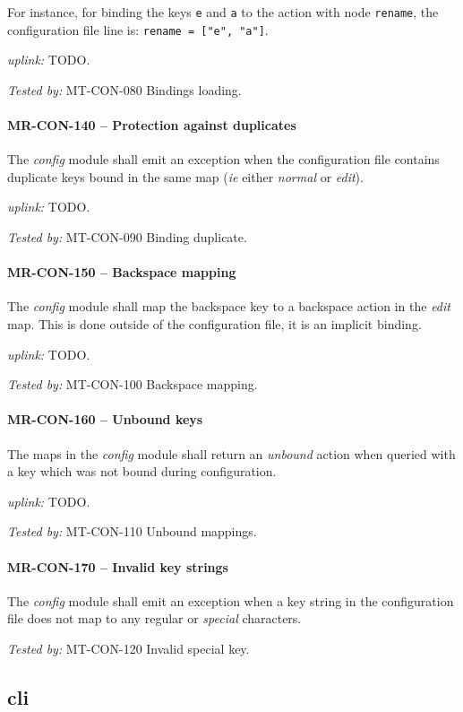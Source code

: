 For instance, for binding the keys \lstinline{e} and \lstinline{a}
to the action with node \lstinline{rename}, the configuration file
line is: \lstinline{rename = ["e", "a"]}.

\textit{uplink: } TODO.

\textit{Tested by: } MT-CON-080 Bindings loading.

\paragraph{MR-CON-140 -- Protection against duplicates}
The \emph{config} module shall emit an exception when the configuration
file contains duplicate keys bound in the same map (\textit{ie} either
\emph{normal} or \emph{edit}).

\textit{uplink: } TODO.

\textit{Tested by: } MT-CON-090 Binding duplicate.

\paragraph{MR-CON-150 -- Backspace mapping}
The \emph{config} module shall map the backspace key to a backspace
action in the \emph{edit} map. This is done outside of the configuration
file, it is an implicit binding.

\textit{uplink: } TODO.

\textit{Tested by: } MT-CON-100 Backspace mapping.

\paragraph{MR-CON-160 -- Unbound keys}
The maps in the \emph{config} module shall return an \emph{unbound}
action when queried with a key which was not bound during configuration.

\textit{uplink: } TODO.

\textit{Tested by: } MT-CON-110 Unbound mappings.

\paragraph{MR-CON-170 -- Invalid key strings}
The \emph{config} module shall emit an exception when a key
string in the configuration file does not map to any regular or \emph{special}
characters.

\textit{Tested by: } MT-CON-120 Invalid special key.

\subsection{cli}
